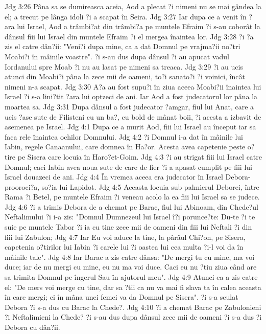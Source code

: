 Jdg 3:26  Pâna sa se dumireasca aceia, Aod a plecat ?i nimeni nu se mai gândea la el; a trecut pe lânga idoli ?i a scapat în Seira.
Jdg 3:27  Iar dupa ce a venit în ?ara lui Israel, Aod a trâmbi?at din trâmbi?a pe muntele Efraim ?i s-au coborât la dânsul fiii lui Israel din muntele Efraim ?i el mergea înaintea lor.
Jdg 3:28  ?i ?a zis el catre dân?ii: "Veni?i dupa mine, ca a dat Domnul pe vrajma?ii no?tri Moabi?i în mâinile voastre". ?i s-au dus dupa dânsul ?i au apucat vadul Iordanului spre Moab ?i nu au lasat pe nimeni sa treaca.
Jdg 3:29  ?i au ucis atunci din Moabi?i pâna la zece mii de oameni, to?i sanato?i ?i voinici, încât nimeni n-a scapat.
Jdg 3:30  A?a au fost supu?i în ziua aceea Moabi?ii înaintea lui Israel ?i s-a lini?tit ?ara lui optzeci de ani. Iar Aod a fost judecatorul lor pâna la moartea sa.
Jdg 3:31  Dupa dânsul a fost judecator ?amgar, fiul lui Anat, care a ucis ?ase sute de Filisteni cu un ba?, cu bold de mânat boii, ?i acesta a izbavit de asemenea pe Israel.
Jdg 4:1  Dupa ce a murit Aod, fiii lui Israel au început iar sa faca rele înaintea ochilor Domnului.
Jdg 4:2  ?i Domnul i-a dat în mâinile lui Iabin, regele Canaanului, care domnea în Ha?or. Acesta avea capetenie peste o?tire pe Sisera care locuia în Haro?et-Goim.
Jdg 4:3  ?i au strigat fiii lui Israel catre Domnul; caci Iabin avea noua sute de care de fier ?i a apasat cumplit pe fiii lui Israel douazeci de ani.
Jdg 4:4  În vremea aceea era judecator în Israel Debora-prooroci?a, so?ia lui Lapidot.
Jdg 4:5  Aceasta locuia sub palmierul Deborei, între Rama ?i Betel, pe muntele Efraim ?i veneau acolo la ea fiii lui Israel sa se judece.
Jdg 4:6  ?i a trimis Debora de a chemat pe Barac, fiul lui Abinoam, din Chede?ul Neftalimului ?i i-a zis: "Domnul Dumnezeul lui Israel î?i porunce?te: Du-te ?i te suie pe muntele Tabor ?i ia cu tine zece mii de oameni din fiii lui Neftali ?i din fiii lui Zabulon;
Jdg 4:7  Iar Eu voi aduce la tine, la pârâul Chi?on, pe Sisera, capetenia o?tirilor lui Iabin ?i carele lui ?i oastea lui cea multa ?i-l voi da în mâinile tale".
Jdg 4:8  Iar Barac a zis catre dânsa: "De mergi tu cu mine, ma voi duce; iar de nu mergi cu mine, eu nu ma voi duce. Caci eu nu ?tiu ziua când are sa trimita Domnul pe îngerul Sau în ajutorul meu".
Jdg 4:9  Atunci ea a zis catre el: "De mers voi merge cu tine, dar sa ?tii ca nu va mai fi slava ta în calea aceasta în care mergi; ci în mâna unei femei va da Domnul pe Sisera". ?i s-a sculat Debora ?i s-a dus cu Barac la Chede?.
Jdg 4:10  ?i a chemat Barac pe Zabulonieni ?i Neftalimieni la Chede? ?i s-au dus dupa dânsul zece mii de oameni ?i s-a dus ?i Debora cu dân?ii.
